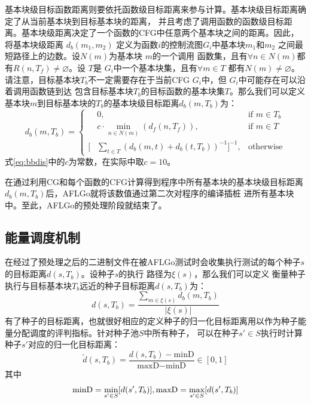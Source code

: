 \documentclass[bachelor]{njupthesis}
\begin{document}
基本块级目标函数距离则要依托函数级目标距离来参与计算。基本块级目标距离确定了从当前基本块到目标基本块的距离，
并且考虑了调用函数的函数级目标距离。基本块级距离决定了一个函数的CFG中任意两个基本块之间的距离。因此，将基本块级距离
$d_b(m_1, m_2)$ 定义为函数$i$的控制流图$G_i$中基本块$m_1$和$m_2$ 之间最短路径上的边数。设$N(m)$为基本块 $m$的一个调用
函数集，且有$\forall n \in N (m)$都有$R(n,T_f) \neq \varnothing$。设 $T$是 $G_i$中一个基本块集，且有$\forall m \in T$ 
都有$N(m)\neq \varnothing$。请注意，目标基本块$T_b$不一定需要存在于当前CFG $G_i$中，但 $G_i$中可能存在可以沿着调用函数链到达
包含目标基本块$T_b$的目标函数的基本块集$T$。那么我们可以定义基本块$m$到目标基本块的$T_b$的基本块级目标距离$d_b(m,T_b)$为：
\begin{equation}\label{eq:bbdis}
	d_b(m,T_b)=\left\{ \begin{aligned}
		&0 ,&\text{if } m \in T_b \\
		&c \cdot \min \limits_{n\in N(m)}(d_f(n,T_f)) , &\text{if } m \in T \\
	   [&\sum\limits_{t\in T} (d_b(m,t)+d_b(t,T_b))^{-1}]^{-1} , &\text{otherwise} 
   \end{aligned}
   \right.
 \end{equation}
式\ref{eq:bbdis}中的$c$为常数，在实际中取$c=10$。

在通过利用CG和每个函数的CFG计算得到程序中所有基本块的基本块级目标距离$d_b(m,T_b)$后，AFLGo就将该数值通过第二次对程序的编译插桩
进所有基本块中。至此，AFLGo的预处理阶段就结束了。

\subsection{能量调度机制}
在经过了预处理之后的二进制文件在被AFLGo测试时会收集执行测试的每个种子$s$的目标距离$d(s,T_b)$。设种子$s$的执行 路径为$\xi (s)$，那么我们可以定义
衡量种子执行与目标基本块$T_b$远近的种子目标距离$d(s,T_b)$为：
\begin{equation}\label{eq:sdis}
	d(s,T_b)=\frac{\sum\limits_{m \in \xi (s)}d_b(m,T_b)}{| \xi(s)| }
\end{equation}
有了种子的目标距离，也就很好相应的定义种子的归一化目标距离用以作为种子能量分配调度的评判指标。针对种子池$S$中所有种子，
可以在种子$s'\in S$执行时计算种子$s'$对应的归一化目标距离：
\begin{equation}\label{eq:sndis}
	\widetilde{d}(s,T_b)=\frac{d(s,T_b)-\text{minD}}{\text{maxD}-\text{minD}} \in [0,1]
\end{equation}
其中
\begin{equation}
	\text{minD}=\min\limits_{s'\in S}[d(s',T_b)] ,\\
	\text{maxD}=\max\limits_{s'\in S}[d(s',T_b)] 	
\end{equation}
\end{document}
